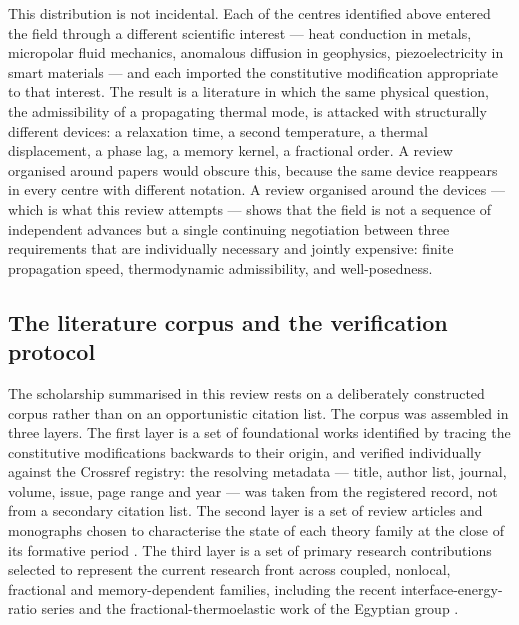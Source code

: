 This distribution is not incidental. Each of the centres identified above entered the field through a different scientific interest --- heat conduction in metals, micropolar fluid mechanics, anomalous diffusion in geophysics, piezoelectricity in smart materials --- and each imported the constitutive modification appropriate to that interest. The result is a literature in which the same physical question, the admissibility of a propagating thermal mode, is attacked with structurally different devices: a relaxation time, a second temperature, a thermal displacement, a phase lag, a memory kernel, a fractional order. A review organised around papers would obscure this, because the same device reappears in every centre with different notation. A review organised around the devices --- which is what this review attempts --- shows that the field is not a sequence of independent advances but a single continuing negotiation between three requirements that are individually necessary and jointly expensive: finite propagation speed, thermodynamic admissibility, and well-posedness.

\subsection{The literature corpus and the verification protocol}

The scholarship summarised in this review rests on a deliberately constructed corpus rather than on an opportunistic citation list. The corpus was assembled in three layers. The first layer is a set of foundational works identified by tracing the constitutive modifications backwards to their origin, and verified individually against the Crossref registry: the resolving metadata --- title, author list, journal, volume, issue, page range and year --- was taken from the registered record, not from a secondary citation list. The second layer is a set of review articles and monographs chosen to characterise the state of each theory family at the close of its formative period \cite{Chandrasekharaiah1986,Chandrasekharaiah1998,Shakeriaski2021,Nowacki1975,Achenbach1973}. The third layer is a set of primary research contributions selected to represent the current research front across coupled, nonlocal, fractional and memory-dependent families, including the recent interface-energy-ratio series \cite{Barak2023,Barak2023IJP,Barak2023JTS,Barak2023MMMS,Gupta2023Energy,Gupta2023IJNMF,Kumar2023PhysScr,Gupta2026HeatMap} and the fractional-thermoelastic work of the Egyptian group \cite{Abouelregal2023}.

